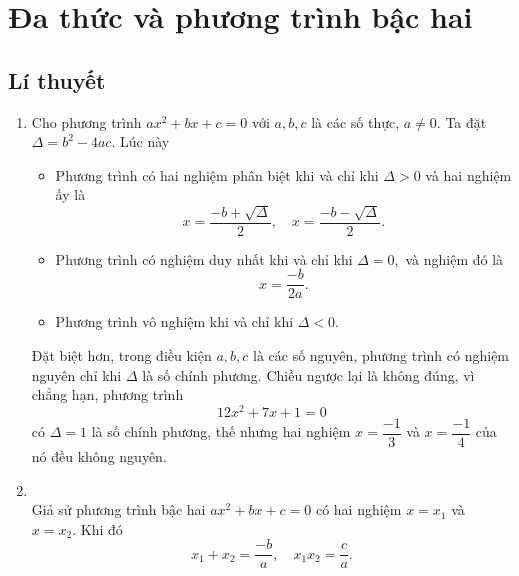 \section{Đa thức và phương trình bậc hai}

\subsection*{Lí thuyết}

\begin{enumerate}
    \item Cho phương trình $ax^2+bx+c=0$ với $a,b,c$ là các số thực, $a\ne 0.$ Ta đặt $\Delta =b^2-4ac.$ Lúc này
    \begin{itemize}
        \item Phương trình có hai nghiệm phân biệt khi và chỉ khi $\Delta>0$ và hai nghiệm ấy là
        $$x=\dfrac{-b+\sqrt{\Delta}}{2},\quad x=\dfrac{-b-\sqrt{\Delta}}{2}.$$
        \item Phương trình  có nghiệm duy nhất khi và chỉ khi $\Delta=0,$ và nghiệm đó là
        $$x=\dfrac{-b}{2a}.$$
        \item Phương trình  vô nghiệm khi và chỉ khi $\Delta<0.$         
    \end{itemize}
    Đặt biệt hơn, trong điều kiện $a,b,c$ là các số nguyên, phương trình có nghiệm nguyên chỉ khi $\Delta$ là số chính phương. Chiều ngược lại là không đúng, vì chẳng hạn, phương trình
    $$12x^2+7x+1=0$$
    có $\Delta=1$ là số chính phương, thế nhưng hai nghiệm $x=\dfrac{-1}{3}$ và $x=\dfrac{-1}{4}$ của nó đều không nguyên.
    \item {} \\Giả sử phương trình bậc hai $ax^2+bx+c=0$ có hai nghiệm $x=x_1$ và $x=x_2.$ Khi đó
    $$x_1+x_2=\dfrac{-b}{a},\quad x_1x_2=\dfrac{c}{a}.$$
\end{enumerate}


